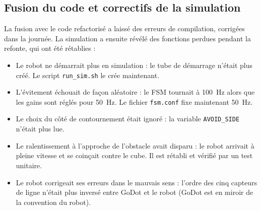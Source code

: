\subsection{Fusion du code et correctifs de la simulation}
La fusion avec le code refactorisé a laissé des erreurs de compilation, corrigées dans la journée.
La simulation a ensuite révélé des fonctions perdues pendant la refonte, qui ont été rétablies :
\begin{itemize}
    \item Le robot ne démarrait plus en simulation : le tube de démarrage n'était plus créé. Le script \texttt{run\_sim.sh} le crée maintenant.
    \item L'évitement échouait de façon aléatoire : le FSM tournait à 100~Hz alors que les gains sont réglés pour 50~Hz. Le fichier \texttt{fsm.conf} fixe maintenant 50~Hz.
    \item Le choix du côté de contournement était ignoré : la variable \texttt{AVOID\_SIDE} n'était plus lue.
    \item Le ralentissement à l'approche de l'obstacle avait disparu : le robot arrivait à pleine vitesse et se coinçait contre le cube. Il est rétabli et vérifié par un test unitaire.
    \item Le robot corrigeait ses erreurs dans le mauvais sens : l'ordre des cinq capteurs de ligne n'était plus inversé entre GoDot et le robot (GoDot est en miroir de la convention du robot).
\end{itemize}
